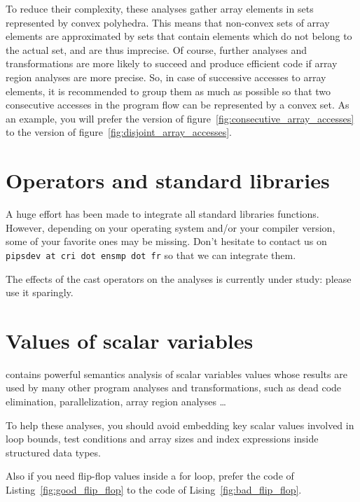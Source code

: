 \documentclass[a4paper]{article}
\begin{document}
To reduce their complexity, these analyses gather array elements in
sets represented by convex polyhedra. This means that non-convex sets
of array elements are approximated by sets that contain elements which
do not belong to the actual set, and are thus imprecise. Of course,
further analyses and transformations are more likely to succeed and
produce efficient code if array region analyses are more precise. So,
in case of successive accesses to array elements, it is recommended to
group them as much as possible so that two consecutive accesses in the
program flow can be represented by a convex set. As an example, you
will prefer the version of figure~\ref{fig:consecutive_array_accesses}
to the version of figure~\ref{fig:disjoint_array_accesses}.




\section{Operators and standard libraries}
\label{sec:operators_and_standard_libraries}

A huge effort has been made to integrate all standard libraries
functions. However, depending on your operating system and/or your
compiler version, some of your favorite ones may be missing. Don't
hesitate to contact us on \texttt{pipsdev at cri dot ensmp dot fr} so
that we can integrate them.

The effects of the cast operators on the analyses is currently under
study: please use it sparingly.

\section{Values of scalar variables}
\label{sec:values_of_scalar_variables}

\Apips contains powerful semantics analysis of scalar variables values
whose results are used by many other program analyses and
transformations, such as dead code elimination, parallelization,
array region analyses \ldots

To help these analyses, you should avoid embedding key scalar values
involved in loop bounds, test conditions and array sizes and index
expressions inside structured data types.

Also if you need flip-flop values inside a for loop, prefer the code
of Listing~\ref{fig:good_flip_flop} to the code of
Lising~\ref{fig:bad_flip_flop}.
\end{document}
